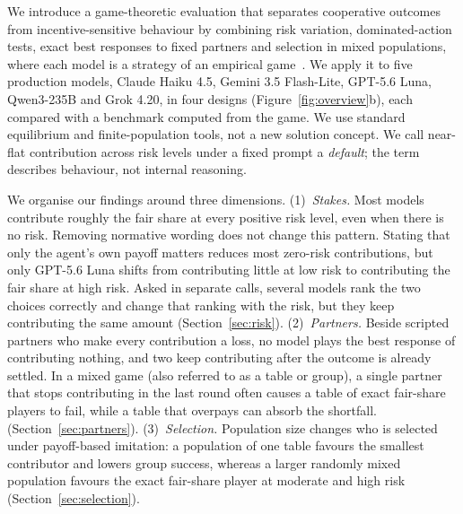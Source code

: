 \documentclass[sigconf,anonymous]{aamas}
\begin{document}
We introduce a game-theoretic evaluation that separates cooperative outcomes from incentive-sensitive behaviour by combining risk variation, dominated-action tests, exact best responses to fixed partners and selection in mixed populations, where each model is a strategy of an empirical game~\cite{wellman2006methods,tuyls2018generalised}. We apply it to five production models, Claude Haiku 4.5, Gemini 3.5 Flash-Lite, GPT-5.6 Luna, Qwen3-235B and Grok 4.20, in four designs (Figure~\ref{fig:overview}b), each compared with a benchmark computed from the game. We use standard equilibrium and finite-population tools, not a new solution concept. We call near-flat  contribution across risk levels under a fixed prompt a \emph{default}; the term describes behaviour, not internal reasoning.

We organise our findings around three dimensions. (1)~\emph{Stakes.} Most models contribute roughly the fair share at every positive risk level, even when there is no risk. Removing normative wording does not change this pattern. Stating that only the agent’s own payoff matters reduces most zero-risk contributions, but only GPT-5.6 Luna shifts from contributing little at low risk to contributing the fair share at high risk. Asked in separate calls, several models rank the two choices correctly and change that ranking with the risk, but they keep contributing  the same amount (Section~\ref{sec:risk}). (2)~\emph{Partners.} Beside scripted partners who make every  contribution a loss, no model plays the best response of contributing  nothing, and two keep contributing  after the outcome is already settled. In a mixed game (also referred to as a table or group), a single partner that stops contributing in the last round often causes a table of exact fair-share players to fail, while a table that overpays can absorb the shortfall. (Section~\ref{sec:partners}). (3)~\emph{Selection.} Population size changes who is selected under payoff-based imitation: a population of one table favours the smallest  contributor  and lowers group success, whereas a larger randomly mixed population favours the exact fair-share player at moderate and high risk (Section~\ref{sec:selection}).


\end{document}
